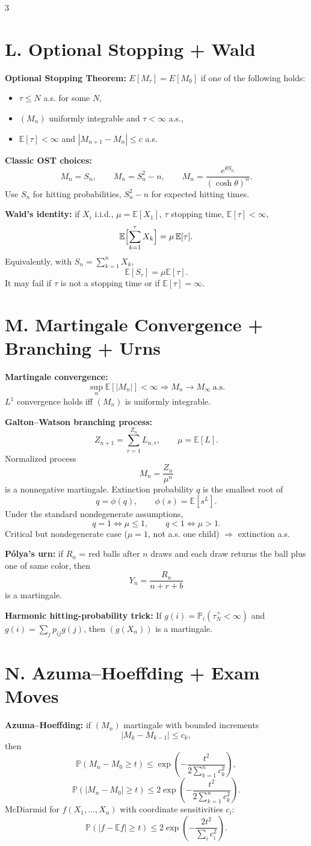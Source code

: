 \documentclass[8pt]{extarticle}
\newcommand{\PP}{\mathbb{P}}
\newcommand{\E}{\mathbb{E}}
\newcommand{\1}{\mathbf{1}}
\begin{document}
\begin{multicols*}{3}
\section*{L. Optional Stopping + Wald}
\textbf{Optional Stopping Theorem:} $E[M_\tau]=E[M_0]$ if one of the following holds:
\begin{itemize}
\item $\tau\le N$ a.s. for some $N$,
\item $(M_n)$ uniformly integrable and $\tau<\infty$ a.s.,
\item $\E[\tau]<\infty$ and $|M_{n+1}-M_n|\le c$ a.s.
\end{itemize}

\textbf{Classic OST choices:}
\[
M_n=S_n,\qquad M_n=S_n^2-n,\qquad M_n=\frac{e^{\theta S_n}}{(\cosh\theta)^n}.
\]
Use $S_n$ for hitting probabilities, $S_n^2-n$ for expected hitting times.

\textbf{Wald's identity:} if $X_i$ i.i.d., $\mu=\E[X_1]$, $\tau$ stopping time, $\E[\tau]<\infty$,
\[
\E\Bigl[\sum_{k=1}^{\tau}X_k\Bigr]=\mu\,\E[\tau].
\]
Equivalently, with $S_n=\sum_{k=1}^n X_k$,
\[
\E[S_\tau]=\mu \E[\tau].
\]
It may fail if $\tau$ is not a stopping time or if $\E[\tau]=\infty$.

\section*{M. Martingale Convergence + Branching + Urns}
\textbf{Martingale convergence:}
\[
\sup_n \E[|M_n|]<\infty \Rightarrow M_n\to M_\infty \ \text{a.s.}
\]
$L^1$ convergence holds iff $(M_n)$ is uniformly integrable.

\textbf{Galton--Watson branching process:}
\[
Z_{n+1}=\sum_{r=1}^{Z_n}L_{n,r},\qquad \mu=\E[L].
\]
Normalized process
\[
M_n=\frac{Z_n}{\mu^n}
\]
is a nonnegative martingale. Extinction probability $q$ is the smallest root of
\[
q=\phi(q),\qquad \phi(s)=\E[s^L].
\]
Under the standard nondegenerate assumptions,
\[
q=1 \iff \mu\le1,\qquad q<1 \iff \mu>1.
\]
Critical but nondegenerate case ($\mu=1$, not a.s. one child) $\Rightarrow$ extinction a.s.

\textbf{P\'olya's urn:} if $R_n$ = red balls after $n$ draws and each draw returns the ball plus one of same color, then
\[
Y_n=\frac{R_n}{n+r+b}
\]
is a martingale.

\textbf{Harmonic hitting-probability trick:}
If $g(i)=\PP_i(\tau_N^+<\infty)$ and $g(i)=\sum_j p_{ij}g(j)$, then $(g(X_n))$ is a martingale.

\section*{N. Azuma--Hoeffding + Exam Moves}
\textbf{Azuma--Hoeffding:} if $(M_n)$ martingale with bounded increments
\[
|M_k-M_{k-1}|\le c_k,
\]
then
\[
\PP(M_n-M_0\ge t)\le \exp\!\left(-\frac{t^2}{2\sum_{k=1}^n c_k^2}\right),
\]
\[
\PP(|M_n-M_0|\ge t)\le 2\exp\!\left(-\frac{t^2}{2\sum_{k=1}^n c_k^2}\right).
\]
McDiarmid for $f(X_1,\dots,X_n)$ with coordinate sensitivities $c_i$:
\[
\PP(|f-\E f|\ge t)\le 2\exp\!\left(-\frac{2t^2}{\sum_i c_i^2}\right).
\]


\end{multicols*}
\end{document}
